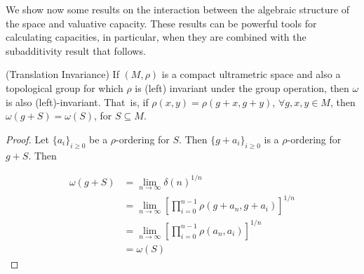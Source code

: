 

We show now some results on the interaction between the algebraic structure of the space and valuative capacity. These results can be powerful tools for calculating capacities, in particular, when they are combined with the subadditivity result that follows.\\
 
\begin{proposition}
\label{translation invariance}
	(Translation Invariance) If $(M, \rho)$ is a compact ultrametric space and also a topological group for which $\rho$ is (left) invariant under the group operation, then $\omega$ is also (left)-invariant. That\ is, if $\rho(x,y)=\rho(g+x,g+y)$, $ \forall g,x,y \in M$, then $\omega(g+S)=\omega(S)$, for $S \subseteq M$.	
\end{proposition}

\begin{proof}
	Let $\{a_i\}_{i\geq 0}$ be a $\rho$-ordering for $S$. Then $\{g+a_i\}_{i\geq 0}$ is a $\rho$-ordering for $g+S$. Then

	\begin{align*} 
	\omega(g+S) &= \lim_{n\to\infty} \delta(n)^{1/n}   \\
	&= \lim_{n\to\infty} [\prod_{i=0}^{n-1} \rho(g+a_n,g+a_i)]^{1/n}   \\ 
	&=\lim_{n\to\infty} [\prod_{i=0}^{n-1} \rho(a_n,a_i)]^{1/n}	  \\
	&= \omega(S) 
	\end{align*}

\end{proof}	

